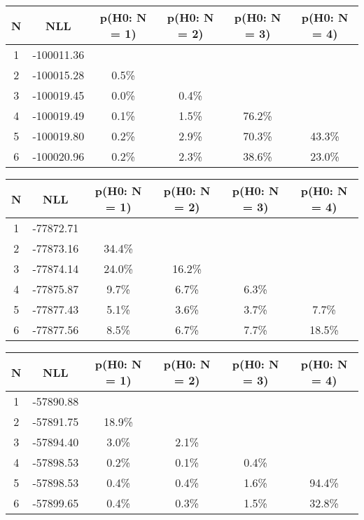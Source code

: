 \begin{table}[htb]
	\begin{center}
{\footnotesize\renewcommand{\arraystretch}{1.4}
		\begin{tabular}{cc||cccc}
			N & NLL & p(H0: N = 1) & p(H0: N = 2) & p(H0: N = 3) & p(H0: N = 4)\\ 
		\hline
1 & -100011.36 & & & & \\
2 & -100015.28 & 0.5\% & & & \\
3 & -100019.45 & 0.0\% & 0.4\% & & \\
4 & -100019.49 & 0.1\% & 1.5\% & 76.2\% & \\
5 & -100019.80 & 0.2\% & 2.9\% & 70.3\% & 43.3\% \\
6 & -100020.96 & 0.2\% & 2.3\% & 38.6\% & 23.0\% \\
	\end{tabular}
		\label{tab:lab}
	}
	\end{center}\end{table}

\begin{table}[htb]
	\begin{center}
{\footnotesize\renewcommand{\arraystretch}{1.4}
		\begin{tabular}{cc||cccc}
			N & NLL & p(H0: N = 1) & p(H0: N = 2) & p(H0: N = 3) & p(H0: N = 4)\\ 
		\hline
1 & -77872.71 & & & & \\
2 & -77873.16 & 34.4\% & & & \\
3 & -77874.14 & 24.0\% & 16.2\% & & \\
4 & -77875.87 & 9.7\% & 6.7\% & 6.3\% & \\
5 & -77877.43 & 5.1\% & 3.6\% & 3.7\% & 7.7\% \\
6 & -77877.56 & 8.5\% & 6.7\% & 7.7\% & 18.5\% \\
	\end{tabular}
		\label{tab:lab}
	}
	\end{center}\end{table}

\begin{table}[htb]
	\begin{center}
{\footnotesize\renewcommand{\arraystretch}{1.4}
		\begin{tabular}{cc||cccc}
			N & NLL & p(H0: N = 1) & p(H0: N = 2) & p(H0: N = 3) & p(H0: N = 4)\\ 
		\hline
1 & -57890.88 & & & & \\
2 & -57891.75 & 18.9\% & & & \\
3 & -57894.40 & 3.0\% & 2.1\% & & \\
4 & -57898.53 & 0.2\% & 0.1\% & 0.4\% & \\
5 & -57898.53 & 0.4\% & 0.4\% & 1.6\% & 94.4\% \\
6 & -57899.65 & 0.4\% & 0.3\% & 1.5\% & 32.8\% \\
	\end{tabular}
		\label{tab:lab}
	}
	\end{center}\end{table}

